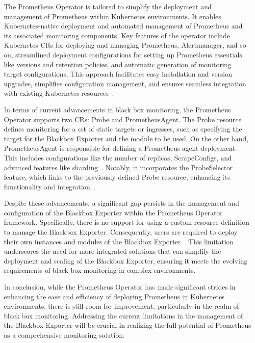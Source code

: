 The Prometheus Operator is tailored to simplify the deployment and management of Prometheus within Kubernetes environments. It enables Kubernetes-native deployment and automated management of Prometheus and its associated monitoring components. Key features of the operator include Kubernetes \ac{CR}s for deploying and managing Prometheus, Alertmanager, and so on, streamlined deployment configurations for setting up Prometheus essentials like versions and retention policies, and automatic generation of monitoring target configurations. This approach facilitates easy installation and version upgrades, simplifies configuration management, and ensures seamless integration with existing Kubernetes resources~\parencite{prometheusoperatorIntroduction2020}. 

In terms of current advancements in black box monitoring, the Prometheus Operator supports two \ac{CR}s: Probe and PrometheusAgent. The Probe resource defines monitoring for a set of static targets or ingresses, such as specifying the target for the Blackbox Exporter and the module to be used. On the other hand, PrometheusAgent is responsible for defining a Prometheus agent deployment. This includes configurations like the number of replicas, ScrapeConfigs, and advanced features like sharding~\parencite{prometheusoperatorPrometheusAgentSupport}. Notably, it incorporates the ProbeSelector feature, which links to the previously defined Probe resource, enhancing its functionality and integration~\parencite{prometheusoperatorAPIReference}.

Despite these advancements, a significant gap persists in the management and configuration of the Blackbox Exporter within the Prometheus Operator framework. Specifically, there is no support for using a custom resource definition to manage the Blackbox Exporter. Consequently, users are required to deploy their own instances and modules of the Blackbox Exporter~\parencite{prometheusBlackboxExporter2023}. This limitation underscores the need for more integrated solutions that can simplify the deployment and scaling of the Blackbox Exporter, ensuring it meets the evolving requirements of black box monitoring in complex environments. 

In conclusion, while the Prometheus Operator has made significant strides in enhancing the ease and efficiency of deploying Prometheus in Kubernetes environments, there is still room for improvement, particularly in the realm of black box monitoring. Addressing the current limitations in the management of the Blackbox Exporter will be crucial in realizing the full potential of Prometheus as a comprehensive monitoring solution. 